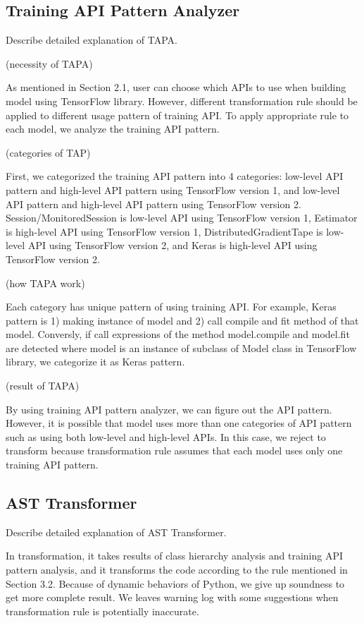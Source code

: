 \subsection{Training API Pattern Analyzer}
Describe detailed explanation of TAPA.

(necessity of TAPA)

As mentioned in Section 2.1, user can choose which APIs to use
when building model using TensorFlow library.
However, different transformation rule should be applied
to different usage pattern of training API.
To apply appropriate rule to each model, we analyze the training API pattern.

(categories of TAP)

First, we categorized the training API pattern into 4 categories:
low-level API pattern and high-level API pattern using TensorFlow version 1, and
low-level API pattern and high-level API pattern using TensorFlow version 2.
Session/MonitoredSession is low-level API using TensorFlow version 1,
Estimator is high-level API using TensorFlow version 1,
DistributedGradientTape is low-level API using TensorFlow version 2,
and Keras is high-level API using TensorFlow version 2.

(how TAPA work)

Each category has unique pattern of using training API.
For example, Keras pattern is 1) making instance of model and
2) call compile and fit method of that model.
Conversly, if call expressions of the method model.compile and model.fit are detected
where model is an instance of subclass of Model class in TensorFlow library,
we categorize it as Keras pattern.

(result of TAPA)

By using training API pattern analyzer, we can figure out the API pattern.
However, it is possible that model uses more than one categories of API pattern
such as using both low-level and high-level APIs.
In this case, we reject to transform because transformation rule assumes
that each model uses only one training API pattern.

\subsection{AST Transformer}
Describe detailed explanation of AST Transformer.

In transformation, it takes results of class hierarchy analysis
and training API pattern analysis, and it transforms the code
according to the rule mentioned in Section 3.2.
Because of dynamic behaviors of Python, we give up soundness
to get more complete result.
We leaves warning log with some suggestions
when transformation rule is potentially inaccurate.

